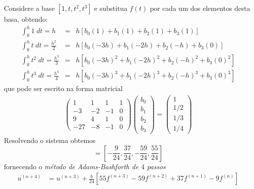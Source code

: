 \begin{ex}
Considere a base $[1, t, t^2, t^3]$ e substitua $f(t)$ por cada um dos elementos desta basa, obtendo:
\begin{eqnarray}
  \int _0^{h} 1  \;dt = h             &=& h\left[ b_0(1)  +b_1(1)    + b_2(1)   + b_3(1)    \right]\\
  \int _0^{h} t  \;dt = \frac{h^2}{2}  &=& h\left[ b_0(-3h)  +b_1(-2h)   + b_2(-h) + b_3(0)  \right]\\
  \int _0^{h} t^2 \;dt = \frac{h^3}{3}  &=& h\left[b_0(-3h)^2 +b_1(-2h)^2  + b_2(-h)^2+ b_3(0)^2 \right]\\
  \int _0^{h} t^3 \;dt = \frac{h^4}{4} &=& h\left[ b_0(-3h)^3 +b_1(-2h)^3  + b_2(-h)^3+ b_3(0)^3 \right]
\end{eqnarray}
que pode ser escrito na forma matricial
\begin{eqnarray}
\left(
  \begin{array}{cccc}
    1  &  1  &  1  &  1\\
    -3  &  -2  &  -1  &  0\\
    9  &  4  &  1  &  0\\
    -27  &  -8  & -1  &  0
  \end{array}
\right)
\left(\begin{array}{c}  b_0 \\ b_1\\ b_2\\b_3   \end{array}\right)
=
\left(\begin{array}{c}  1  \\ 1/2 \\ 1/3 \\ 1/4  \end{array}\right)
\end{eqnarray}
Resolvendo o sistema obtemos
\begin{equation} [b_0,b_1,b_2,b_3]=\left[-\frac{9}{24},\frac{37}{24},-\frac{59}{24},\frac{55}{24}\right] \end{equation}
fornecendo o \emph{método de Adams-Bashforth de $4$ passos}
\begin{eqnarray}\label{AB4}
  u^{(n+4)}  &= u^{(n+3)}  + \frac{h}{24} [55 f^{(n+3)} -59f^{(n+2)} +37f^{(n+1)} -9f^{(n)}]
\end{eqnarray}
\end{ex}



